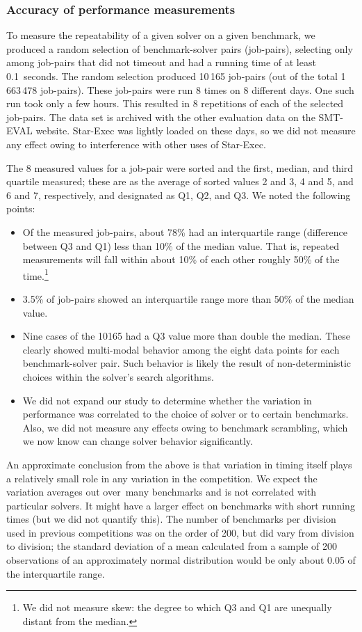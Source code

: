 \documentclass[smallcondensed]{svjour3}
\begin{document}
 
\subsubsection{Accuracy of performance measurements}
\label{Accuracy}

To measure the repeatability of a given solver on a given benchmark, we produced a random selection of benchmark-solver pairs (job-pairs), selecting only among job-pairs that did not timeout and had a running time of at least 0.1~seconds. The random selection produced 10\,165 job-pairs (out of the total 1\,663\,478 job-pairs). These job-pairs were run 8 times on 8 different days. One such run took only a few hours. This resulted in 8 repetitions of each of the selected job-pairs. The data set is archived with the other evaluation data on the SMT-EVAL website. Star-Exec was lightly loaded on these days, so we did not measure any effect owing to interference with other uses of Star-Exec.

The 8 measured values for a job-pair were sorted and the first, median, and third quartile measured; these are as the average of sorted values 2 and 3, 4 and 5, and 6 and 7, respectively, and designated as Q1, Q2, and Q3. We noted the following points:
\begin{itemize}[noitemsep,nolistsep]
\item Of the measured job-pairs, about 78\% had an interquartile range (difference between Q3 and Q1) less than 10\% of the median value. That is, repeated measurements will fall within about 10\% of each other roughly 50\% of the time.\footnote{We did not measure skew: the degree to which Q3 and Q1 are unequally distant from the median.}
\item 3.5\% of job-pairs showed an interquartile range more than 50\% of the median value. 
\item Nine cases of the 10165 had a Q3 value more than double the median. These clearly showed multi-modal behavior among the eight data points for each benchmark-solver pair. Such behavior is likely the result of non-deterministic choices within the solver's search algorithms. 
\item We did not expand our study to determine whether the variation in performance was correlated to the choice of solver or to certain benchmarks. Also, we did not measure any effects owing to benchmark scrambling, which we now know can change solver behavior significantly.
\end{itemize}

An approximate conclusion from the above is that variation in timing itself plays a relatively small role in any variation in the competition. We expect the variation averages out over\ many benchmarks and is not correlated with particular solvers. It might have a larger effect on benchmarks with short running times (but we did not quantify this). The number of benchmarks per division used in previous competitions was on the order of 200, but did vary from division to division; the standard deviation of a mean calculated from a sample of 200 observations of an approximately normal distribution would be only about 0.05 of the interquartile range. 
\end{document}

